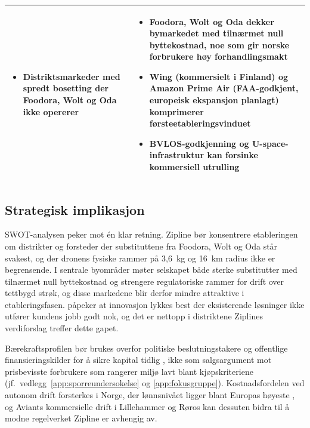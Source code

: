 \begin{table}[H]
\begin{tabularx}{\textwidth}{@{} X X @{}}
\begin{minipage}[t]{\linewidth}
\begin{itemize}[leftmargin=1.2em, nosep]
  drift nettopp i Norge
  \item Distriktsmarkeder med spredt bosetting der Foodora, Wolt og Oda ikke
  opererer
\end{itemize}
\vspace{0.4em}
\end{minipage}
&
\begin{minipage}[t]{\linewidth}
\begin{itemize}[leftmargin=1.2em, nosep]
  \item Foodora, Wolt og Oda dekker bymarkedet med tilnærmet null
  byttekostnad, noe som gir norske forbrukere høy forhandlingsmakt
  \item Wing (kommersielt i Finland) og Amazon Prime Air (FAA-godkjent,
  europeisk ekspansjon planlagt) komprimerer førsteetableringsvinduet
  \item BVLOS-godkjenning og U-space-infrastruktur kan forsinke kommersiell
  utrulling
\end{itemize}
\vspace{0.4em}
\end{minipage} \\
\bottomrule
\end{tabularx}
\end{table}

\subsection{Strategisk implikasjon}

SWOT-analysen peker mot én klar retning. Zipline bør konsentrere etableringen
om distrikter og forsteder der substituttene fra Foodora, Wolt og Oda står
svakest, og der dronens fysiske rammer på 3{,}6~kg og 16~km radius
ikke er begrensende. I sentrale byområder møter
selskapet både sterke substitutter med tilnærmet null byttekostnad og
strengere regulatoriske rammer for drift over tettbygd strøk, og disse
markedene blir derfor mindre attraktive i etableringsfasen.
\textcite[58]{christensen2016} påpeker at innovasjon lykkes best der
eksisterende løsninger ikke utfører kundens jobb godt nok, og det er nettopp i
distriktene Ziplines verdiforslag treffer dette gapet.

Bærekraftsprofilen bør brukes overfor politiske beslutningstakere og
offentlige
finansieringskilder for å sikre kapital tidlig
\parencite{stortingsmelding2025}, ikke som salgsargument mot prisbevisste
forbrukere som rangerer miljø lavt blant kjøpskriteriene
(jf.\ vedlegg~\ref{app:sporreundersokelse} og \ref{app:fokusgruppe}). Kostnadsfordelen ved autonom drift forsterkes i Norge, der
lønnsnivået ligger blant Europas høyeste \parencite{ssb2024}, og Aviants
kommersielle drift i Lillehammer og Røros \parencite{aviant2024} kan dessuten
bidra til å modne regelverket Zipline er avhengig av.

